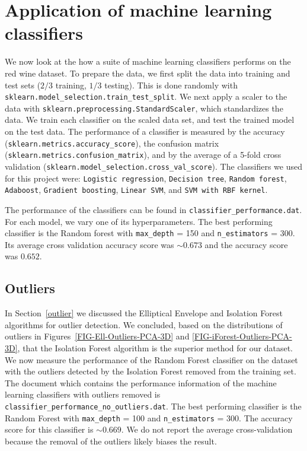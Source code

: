 \documentclass[12pt,preprint]{aastex61}
\begin{document}
 \section{Application of machine learning classifiers \label{classifiers}}

 We now look at the how a suite of machine learning classifiers
performs on the red wine dataset. To prepare the data, we first split the data into training and test sets
($2/3$ training, $1/3$ testing). This is done randomly with
 \texttt{sklearn.model\_selection.train\_test\_split}. We next apply a
scaler to the data with \texttt{sklearn.preprocessing.StandardScaler},
which standardizes the data. We train each classifier on the scaled
data set, and test the trained model on the test data. The performance
of a classifier is measured by the accuracy
(\texttt{sklearn.metrics.accuracy\_score}), the confusion matrix
(\texttt{sklearn.metrics.confusion\_matrix}), and by the average of a 5-fold
cross validation (\texttt{sklearn.model\_selection.cross\_val\_score}). The
classifiers we used for this project were: \texttt{Logistic regression},
\texttt{Decision tree}, \texttt{Random forest}, \texttt{Adaboost},
\texttt{Gradient boosting}, \texttt{Linear SVM}, and \texttt{SVM with RBF kernel}.

The performance of the classifiers can be found in \texttt{classifier\_performance.dat}. For each
model, we vary one of its hyperparameters. The best performing classifier is the
Random forest with \texttt{max\_depth} = 150 and \texttt{n\_estimators} = 300. Its
average cross validation accuracy score was $\sim 0.673$ and the accuracy score was
$0.652$. 

\subsection{Outliers}

In Section~\ref{outlier} we discussed the Elliptical Envelope and
Isolation Forest algorithms for outlier detection. We concluded, based
on the distributions of outliers in
Figures~\ref{FIG-Ell-Outliers-PCA-3D} and
\ref{FIG-iForest-Outliers-PCA-3D}, that the Isolation Forest algorithm
is the superior method for our dataset. We now measure the performance
of the Random Forest classifier on the dataset with the outliers
detected by the Isolation Forest removed from the training set. The
document which contains the performance information of the machine
learning classifiers with outliers removed is
\texttt{classifier\_performance\_no\_outliers.dat}. The best performing
classifier is the Random Forest with \texttt{max\_depth} = 100 and
\texttt{n\_estimators} = 300.  The accuracy score for this classifier
is $\sim 0.669$. We do not report the average cross-validation because
the removal of the outliers likely biases the result.
\end{document}
